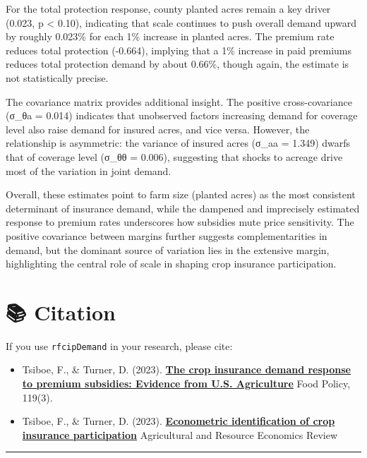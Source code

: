 \documentclass[
]{article}
\begin{document}
For the total protection response, county planted acres remain a key
driver (0.023, p \textless{} 0.10), indicating that scale continues to
push overall demand upward by roughly 0.023\% for each 1\% increase in
planted acres. The premium rate reduces total protection (-0.664),
implying that a 1\% increase in paid premiums reduces total protection
demand by about 0.66\%, though again, the estimate is not statistically
precise.

The covariance matrix provides additional insight. The positive
cross-covariance (σ\_θa = 0.014) indicates that unobserved factors
increasing demand for coverage level also raise demand for insured
acres, and vice versa. However, the relationship is asymmetric: the
variance of insured acres (σ\_aa = 1.349) dwarfs that of coverage level
(σ\_θθ = 0.006), suggesting that shocks to acreage drive most of the
variation in joint demand.

Overall, these estimates point to farm size (planted acres) as the most
consistent determinant of insurance demand, while the dampened and
imprecisely estimated response to premium rates underscores how
subsidies mute price sensitivity. The positive covariance between
margins further suggests complementarities in demand, but the dominant
source of variation lies in the extensive margin, highlighting the
central role of scale in shaping crop insurance participation.

\section{📚 Citation}\label{citation}

If you use \texttt{rfcipDemand} in your research, please cite:

\begin{itemize}
\item
  Tsiboe, F., \& Turner, D. (2023).
  \href{https://doi.org/10.1016/j.foodpol.2023.102505}{\textbf{The crop
  insurance demand response to premium subsidies: Evidence from U.S.
  Agriculture}} Food Policy, 119(3).
\item
  Tsiboe, F., \& Turner, D. (2023).
  \href{https://doi.org/10.1017/age.2023.13}{\textbf{Econometric
  identification of crop insurance participation}} Agricultural and
  Resource Economics Review
\end{itemize}

\begin{center}\rule{0.5\linewidth}{0.5pt}\end{center}
\end{document}
